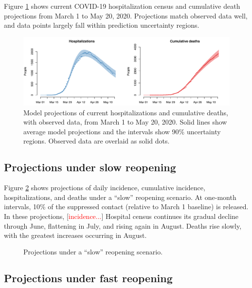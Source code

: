 \documentclass[11pt]{article}
\newcommand{\comment}[1]{[\textcolor{red}{#1}]}
\begin{document}

Figure \ref{fig:calibration} shows current COVID-19 hospitalization census and cumulative death projections from March 1 to May 20, 2020.  Projections match observed data well, and data points largely fall within prediction uncertainty regions. 


\begin{figure}
\centering
\includegraphics[width=\textwidth]{figures/calibration.pdf}
\caption{Model projections of current hospitalizations and cumulative deaths, with observed data, from March 1 to May 20, 2020. Solid lines show average model projections and the intervals show 90\% uncertainty regions.  Observed data are overlaid as solid dots.} 
\label{fig:calibration}
\end{figure}


\subsection*{Projections under slow reopening} 

Figure \ref{fig:slow} shows projections of daily incidence, cumulative incidence, hospitalizations, and deaths under a ``slow'' reopening scenario. At one-month intervals, 10\% of the suppressed contact (relative to March 1 baseline) is released. In these projections, \comment{incidence...} Hospital census continues its gradual decline through June, flattening in July, and rising again in August. Deaths rise slowly, with the greatest increases occurring in August. 


\begin{figure}
\centering
\comment{slow reopen placeholder}
\caption{Projections under a ``slow'' reopening scenario. }
\label{fig:slow}
\end{figure}



\subsection*{Projections under fast reopening} 
\end{document}
